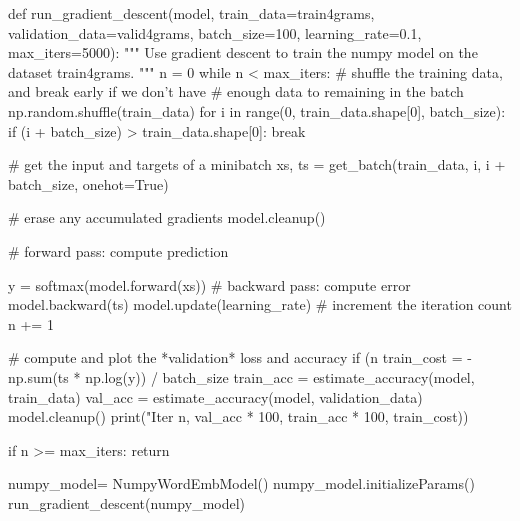 \documentclass[12pt]{article}
\begin{document}
\begin{python}
def run_gradient_descent(model,
                         train_data=train4grams,
                         validation_data=valid4grams,
                         batch_size=100,
                         learning_rate=0.1,
                         max_iters=5000):
    """
    Use gradient descent to train the numpy model on the dataset train4grams.
    """
    n = 0
    while n < max_iters:
        # shuffle the training data, and break early if we don't have
        # enough data to remaining in the batch
        np.random.shuffle(train_data)
        for i in range(0, train_data.shape[0], batch_size):
            if (i + batch_size) > train_data.shape[0]:
                break

            # get the input and targets of a minibatch
            xs, ts = get_batch(train_data, i, i + batch_size, onehot=True)

            # erase any accumulated gradients
            model.cleanup()

            # forward pass: compute prediction

            y = softmax(model.forward(xs))
            # backward pass: compute error 
            model.backward(ts)
            model.update(learning_rate)
            # increment the iteration count
            n += 1

            # compute and plot the *validation* loss and accuracy
            if (n %
                train_cost = -np.sum(ts * np.log(y)) / batch_size
                train_acc = estimate_accuracy(model, train_data)
                val_acc = estimate_accuracy(model, validation_data)
                model.cleanup()
                print("Iter %
                      n, val_acc * 100, train_acc * 100, train_cost))

        if n >= max_iters:
            return


numpy_model= NumpyWordEmbModel()
numpy_model.initializeParams()
run_gradient_descent(numpy_model)
\end{python}
\end{document}
